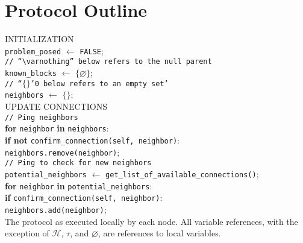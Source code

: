 \documentclass{article}
\begin{document}
\section*{Protocol Outline}
\begin{algorithm}[H]
	INITIALIZATION \\
		\hspace{5mm}\texttt{problem\_posed} $\gets$ \texttt{FALSE}; \\
		\hspace{5mm}\texttt{// ``$\varnothing$'' below refers to the null parent} \\
		\hspace{5mm}\texttt{known\_blocks} $\gets$ $\{\varnothing\}$; \\
		\hspace{5mm}\texttt{// ``$\{\}$'0 below refers to an empty set'} \\
		\hspace{5mm}\texttt{neighbors} $\gets$ $\{\}$; \\
	UPDATE CONNECTIONS \\
		\hspace{5mm}\texttt{// Ping neighbors} \\
		\hspace{5mm}\textbf{for} \texttt{neighbor} \textbf{in} \texttt{neighbors}: \\
		\hspace{10mm}\textbf{if not} \texttt{confirm\_connection(self, neighbor)}: \\
		\hspace{15mm}\texttt{neighbors.remove(neighbor)}; \\
		\hspace{5mm}\texttt{// Ping to check for new neighbors} \\
		\hspace{5mm}\texttt{potential\_neighbors} $\gets$  \texttt{get\_list\_of\_available\_connections()}; \\
		\hspace{5mm}\textbf{for} \texttt{neighbor} \textbf{in} \texttt{potential\_neighbors}: \\
		\hspace{10mm}\textbf{if} \texttt{confirm\_connection(self, neighbor)}: \\
		\hspace{15mm}\texttt{neighbors.add(neighbor)}; \\
	
	\caption{The protocol as executed locally by each node. All variable references,
		with the exception of $\mathcal{H}$, $\tau$, and $\varnothing$, are
		references to local variables.}
\end{algorithm}
\end{document}

